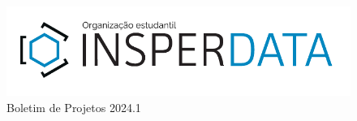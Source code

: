 \documentclass[
    10pt, 
    a4paper, 
    draft
    ]{article}
\begin{document}
\begin{figure}
    \centering
    \includegraphics[width = .8\textwidth]{logo/logo_nova.pdf}
    \vspace{10pt}
    \caption*{\Huge Boletim de Projetos 2024.1}
\end{figure}
\clearpage

\tableofcontents











\end{document}

